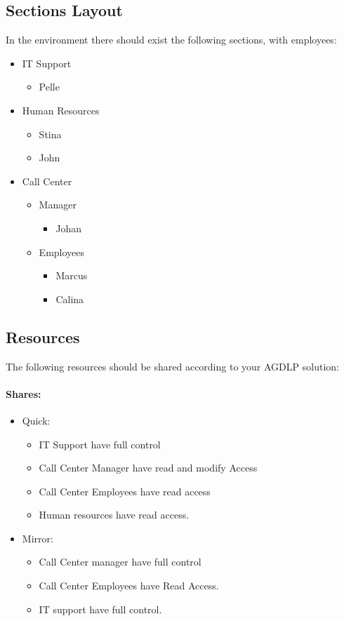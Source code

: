 \documentclass[paper=a4, fontsize=11pt]{report} %
\begin{document}
\subsection{Sections Layout}
In the environment there should exist the following sections, with employees:
\begin{itemize}
	\item IT Support
	\begin{itemize}
		\item Pelle
	\end{itemize}
\end{itemize}
\begin{itemize}
	\item Human Resources
	\begin{itemize}
		\item Stina
		\item John
	\end{itemize}
\end{itemize}
\begin{itemize}
	\item Call Center
	\begin{itemize}
		\item Manager	
		\begin{itemize}
			\item Johan
		\end{itemize}
		
		\item Employees	
		\begin{itemize}
			\item Marcus
			\item Calina
		\end{itemize}
	\end{itemize}
\end{itemize}

\subsection{Resources}
The following resources should be shared according to your AGDLP solution:
\paragraph{Shares:}
\begin{itemize}
	\item Quick:
	\begin{itemize}
		\item IT Support have full control
		\item Call Center Manager have read and modify Access
		\item  Call Center Employees have read access
		\item  Human resources have read access.
	\end{itemize}
	\item Mirror:
	\begin{itemize}
		\item Call Center manager have full control
		\item  Call Center Employees have Read Access.
		\item  IT support have full control.
	\end{itemize}
\end{itemize}
		
\end{document}
